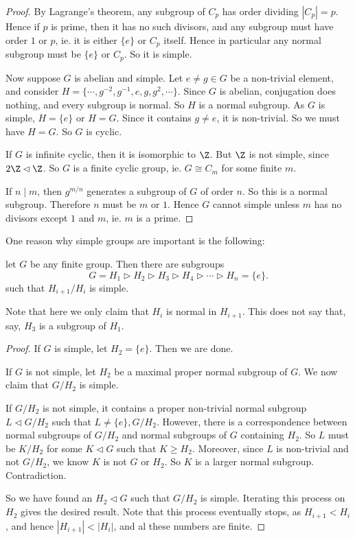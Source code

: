 \documentclass[a4paper]{article}
\begin{document}
\begin{proof}
  By Lagrange's theorem, any subgroup of $C_p$ has order dividing $|C_p| = p$. Hence if $p$ is prime, then it has no such divisors, and any subgroup must have order $1$ or $p$, ie. it is either $\{e\}$ or $C_p$ itself. Hence in particular any normal subgroup must be $\{e\}$ or $C_p$. So it is simple.

  Now suppose $G$ is abelian and simple. Let $e \not= g \in G$ be a non-trivial element, and consider $H = \{\cdots, g^{-2}, g^{-1}, e, g, g^2, \cdots\}$. Since $G$ is abelian, conjugation does nothing, and every subgroup is normal. So $H$ is a normal subgroup. As $G$ is simple, $H = \{e\}$ or $H = G$. Since it contains $g \not= e$, it is non-trivial. So we must have $H = G$. So $G$ is cyclic.

  If $G$ is infinite cyclic, then it is isomorphic to $\Z$. But $\Z$ is not simple, since $2\Z \lhd \Z$. So $G$ is a finite cyclic group, ie. $G \cong C_m$ for some finite $m$.

  If $n \mid m$, then $g^{m/n}$ generates a subgroup of $G$ of order $n$. So this is a normal subgroup. Therefore $n$ must be $m$ or $1$. Hence $G$ cannot simple unless $m$ has no divisors except $1$ and $m$, ie. $m$ is a prime.
\end{proof}

One reason why simple groups are important is the following:
\begin{thm}
  let $G$ be any finite group. Then there are subgroups
  \[
    G = H_1 \rhd H_2 \rhd H_3 \rhd H_4 \rhd \cdots \rhd H_n = \{e\}.
  \]
  such that $H_{i + 1}/H_i$ is simple.
\end{thm}
Note that here we only claim that $H_i$ is normal in $H_{i + 1}$. This does not say that, say, $H_3$ is a subgroup of $H_1$.

\begin{proof}
  If $G$ is simple, let $H_2 = \{e\}$. Then we are done.

  If $G$ is not simple, let $H_2$ be a maximal proper normal subgroup of $G$. We now claim that $G/H_2$ is simple.

  If $G/H_2$ is not simple, it contains a proper non-trivial normal subgroup $L \lhd G/H_2$ such that $L \not= \{e\}, G/H_2$. However, there is a correspondence between normal subgroups of $G/H_2$ and normal subgroups of $G$ containing $H_2$. So $L$ must be $K/H_2$ for some $K \lhd G$ such that $K \geq H_2$. Moreover, since $L$ is non-trivial and not $G/H_2$, we know $K$ is not $G$ or $H_2$. So $K$ is a larger normal subgroup. Contradiction.

  So we have found an $H_2 \lhd G$ such that $G/H_2$ is simple. Iterating this process on $H_2$ gives the desired result. Note that this process eventually stops, as $H_{i + 1} < H_i$, and hence $|H_{i + 1}| < |H_i|$, and al these numbers are finite.
\end{proof}
\end{document}
